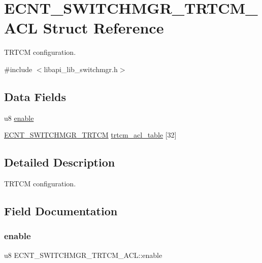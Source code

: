 \hypertarget{structECNT__SWITCHMGR__TRTCM__ACL}{}\section{E\+C\+N\+T\+\_\+\+S\+W\+I\+T\+C\+H\+M\+G\+R\+\_\+\+T\+R\+T\+C\+M\+\_\+\+A\+CL Struct Reference}
\label{structECNT__SWITCHMGR__TRTCM__ACL}


T\+R\+T\+CM configuration.  




{\ttfamily \#include $<$libapi\+\_\+lib\+\_\+switchmgr.\+h$>$}

\subsection*{Data Fields}
\begin{DoxyCompactItemize}
\item 
u8 \hyperlink{structECNT__SWITCHMGR__TRTCM__ACL_a27a5bf8afc3d78bbe2aa74e9c9da5cc6}{enable}
\item 
\hyperlink{structECNT__SWITCHMGR__TRTCM}{E\+C\+N\+T\+\_\+\+S\+W\+I\+T\+C\+H\+M\+G\+R\+\_\+\+T\+R\+T\+CM} \hyperlink{structECNT__SWITCHMGR__TRTCM__ACL_a15e516bec149365cd5132841fd9571f0}{trtcm\+\_\+acl\+\_\+table} \mbox{[}32\mbox{]}
\end{DoxyCompactItemize}


\subsection{Detailed Description}
T\+R\+T\+CM configuration. 

\subsection{Field Documentation}
\mbox{\label{structECNT__SWITCHMGR__TRTCM__ACL_a27a5bf8afc3d78bbe2aa74e9c9da5cc6}} 
\subsubsection{\texorpdfstring{enable}{enable}}
{\footnotesize\ttfamily u8 E\+C\+N\+T\+\_\+\+S\+W\+I\+T\+C\+H\+M\+G\+R\+\_\+\+T\+R\+T\+C\+M\+\_\+\+A\+C\+L\+::enable}

